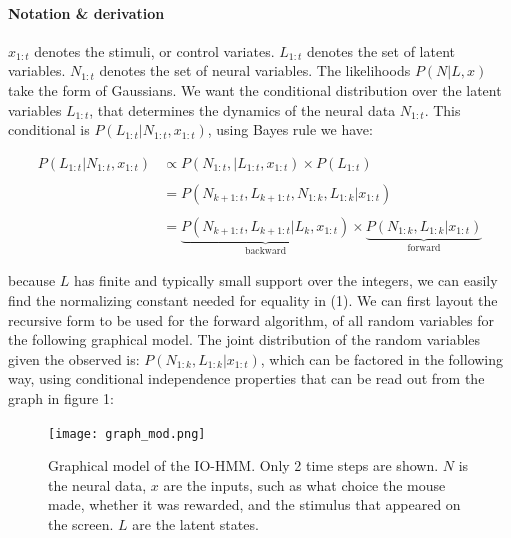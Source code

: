 \documentclass{article}
\begin{document}
\def\Nk{N_{1:k}}
\def\Nkm1{N_{1:k-1}}
\def\Nkp1{N_{k+1:t}}
\def\Nkp2{N_{k+2:t}}
\def\Nm{N_{1:t}}


\def\Lk{L_{1:k}}
\def\Lkm1{L_{1:k-1}}
\def\Lkp1{L_{k+1:t}}
\def\Lkp2{L_{k+2:t}}
\def\Lm{L_{1:t}}
\def\xk{x_{1:k}}
\def\xkm1{x_{1:k-1}}
\def\xkp1{x_{k+1:t}}
\def\xkp2{x_{k+2:t}}
\def\xm{x_{1:t}}

\def\E{\mathbb{E}}

\paragraph{Notation \& derivation}
$\xm$ denotes the stimuli, or control variates. $\Lm$ denotes the set of latent variables.  $\Nm$ denotes the set of neural variables. The likelihoods $P(N | L, x)$ take the form of Gaussians.
We want the conditional distribution over the latent variables $\Lm$, that determines the dynamics of the neural data $\Nm$. This conditional is $P(\Lm | \Nm, \xm)$, using Bayes rule we have: 

\begin{equation}
        \begin{aligned}
        P(\Lm | \Nm, \xm) & \propto P(\Nm,| \Lm, \xm) \times P(\Lm ) \\ \\
        & = P(N_{k+1:t}, L_{k+1:t}, \Nk, \Lk | \xm) \\ \\
        & = \underbrace{P(N_{k+1:t}, L_{k+1:t}| L_k, \xm)}_\text{backward} \times \underbrace{P(\Nk, \Lk | \xm)}_\text{forward}
        \end{aligned}
\end{equation}

\noindent
because $L$ has finite and typically small support over the integers, we can easily find the normalizing constant needed for equality in (1). We can first layout the recursive form to be used for the forward algorithm, of all random variables for the following graphical model. The joint distribution of the random variables given the observed is: $P(\Nk, \Lk | \xm)$, which can be factored in the following way, using conditional independence properties that can be read out from the graph in figure 1: 

\begin{figure}[H]
  \centering
  \texttt{[image: graph\_mod.png]}
  \caption{Graphical model of the IO-HMM. Only 2 time steps are shown. $N$ is the neural data, $x$ are the inputs, such as what choice the mouse made, whether it was rewarded, and the stimulus that appeared on the screen. $L$ are the latent states. }
\end{figure}
\end{document}
